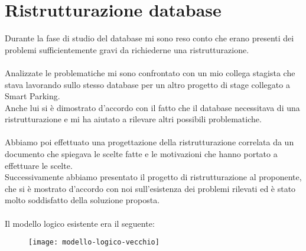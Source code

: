 
\chapter{Ristrutturazione database}
\label{cap:ristrutturazione-database}

Durante la fase di studio del database mi sono reso conto che erano presenti dei problemi sufficientemente gravi 
da richiederne una ristrutturazione.
\\\\
Analizzate le problematiche mi sono confrontato con un mio collega stagista che stava lavorando sullo stesso database per
un altro progetto di stage collegato a Smart Parking.
\\
Anche lui si è dimostrato d'accordo con il fatto che il database necessitava di una ristrutturazione e mi ha aiutato a 
rilevare altri possibili
problematiche.
\\\\
Abbiamo poi effettuato una progettazione della ristrutturazione correlata da un documento che spiegava le scelte fatte
e le motivazioni che hanno portato a effettuare le scelte. 
\\
Successivamente abbiamo presentato il progetto di ristrutturazione al proponente, che si è mostrato d'accordo con
noi sull'esistenza dei problemi rilevati ed è stato molto soddisfatto della soluzione proposta.
\\\\
\clearpage
Il modello logico esistente era il seguente:
\begin{figure}[H]
  \centering
  \texttt{[image: modello-logico-vecchio]}
\end{figure}

